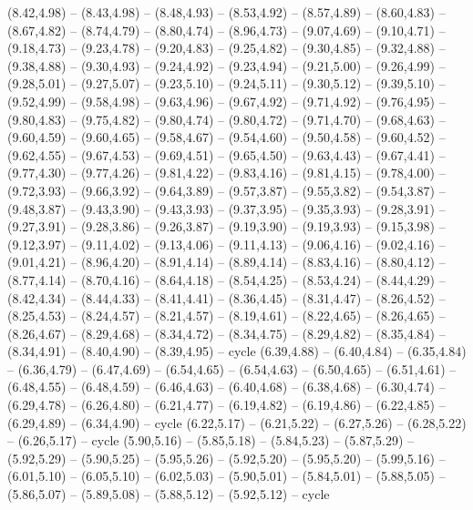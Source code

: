 \expandafter\def\csname geo:gebiet:CHN\endcsname{
  (8.42,4.98) -- (8.43,4.98) -- (8.48,4.93) -- (8.53,4.92) -- (8.57,4.89) -- (8.60,4.83) -- (8.67,4.82) -- (8.74,4.79) -- (8.80,4.74) -- (8.96,4.73) -- (9.07,4.69) -- (9.10,4.71) -- (9.18,4.73) -- (9.23,4.78) -- (9.20,4.83) -- (9.25,4.82) -- (9.30,4.85) -- (9.32,4.88) -- (9.38,4.88) -- (9.30,4.93) -- (9.24,4.92) -- (9.23,4.94) -- (9.21,5.00) -- (9.26,4.99) -- (9.28,5.01) -- (9.27,5.07) -- (9.23,5.10) -- (9.24,5.11) -- (9.30,5.12) -- (9.39,5.10) -- (9.52,4.99) -- (9.58,4.98) -- (9.63,4.96) -- (9.67,4.92) -- (9.71,4.92) -- (9.76,4.95) -- (9.80,4.83) -- (9.75,4.82) -- (9.80,4.74) -- (9.80,4.72) -- (9.71,4.70) -- (9.68,4.63) -- (9.60,4.59) -- (9.60,4.65) -- (9.58,4.67) -- (9.54,4.60) -- (9.50,4.58) -- (9.60,4.52) -- (9.62,4.55) -- (9.67,4.53) -- (9.69,4.51) -- (9.65,4.50) -- (9.63,4.43) -- (9.67,4.41) -- (9.77,4.30) -- (9.77,4.26) -- (9.81,4.22) -- (9.83,4.16) -- (9.81,4.15) -- (9.78,4.00) -- (9.72,3.93) -- (9.66,3.92) -- (9.64,3.89) -- (9.57,3.87) -- (9.55,3.82) -- (9.54,3.87) -- (9.48,3.87) -- (9.43,3.90) -- (9.43,3.93) -- (9.37,3.95) -- (9.35,3.93) -- (9.28,3.91) -- (9.27,3.91) -- (9.28,3.86) -- (9.26,3.87) -- (9.19,3.90) -- (9.19,3.93) -- (9.15,3.98) -- (9.12,3.97) -- (9.11,4.02) -- (9.13,4.06) -- (9.11,4.13) -- (9.06,4.16) -- (9.02,4.16) -- (9.01,4.21) -- (8.96,4.20) -- (8.91,4.14) -- (8.89,4.14) -- (8.83,4.16) -- (8.80,4.12) -- (8.77,4.14) -- (8.70,4.16) -- (8.64,4.18) -- (8.54,4.25) -- (8.53,4.24) -- (8.44,4.29) -- (8.42,4.34) -- (8.44,4.33) -- (8.41,4.41) -- (8.36,4.45) -- (8.31,4.47) -- (8.26,4.52) -- (8.25,4.53) -- (8.24,4.57) -- (8.21,4.57) -- (8.19,4.61) -- (8.22,4.65) -- (8.26,4.65) -- (8.26,4.67) -- (8.29,4.68) -- (8.34,4.72) -- (8.34,4.75) -- (8.29,4.82) -- (8.35,4.84) -- (8.34,4.91) -- (8.40,4.90) -- (8.39,4.95) -- cycle}
\expandafter\def\csname geo:gebiet:TWN\endcsname{
  }
\expandafter\def\csname geo:gebiet:ITA\endcsname{
  (6.39,4.88) -- (6.40,4.84) -- (6.35,4.84) -- (6.36,4.79) -- (6.47,4.69) -- (6.54,4.65) -- (6.54,4.63) -- (6.50,4.65) -- (6.51,4.61) -- (6.48,4.55) -- (6.48,4.59) -- (6.46,4.63) -- (6.40,4.68) -- (6.38,4.68) -- (6.30,4.74) -- (6.29,4.78) -- (6.26,4.80) -- (6.21,4.77) -- (6.19,4.82) -- (6.19,4.86) -- (6.22,4.85) -- (6.29,4.89) -- (6.34,4.90) -- cycle}
\expandafter\def\csname geo:gebiet:DNK\endcsname{
  (6.22,5.17) -- (6.21,5.22) -- (6.27,5.26) -- (6.28,5.22) -- (6.26,5.17) -- cycle}
\expandafter\def\csname geo:gebiet:GBR\endcsname{
  (5.90,5.16) -- (5.85,5.18) -- (5.84,5.23) -- (5.87,5.29) -- (5.92,5.29) -- (5.90,5.25) -- (5.95,5.26) -- (5.92,5.20) -- (5.95,5.20) -- (5.99,5.16) -- (6.01,5.10) -- (6.05,5.10) -- (6.02,5.03) -- (5.90,5.01) -- (5.84,5.01) -- (5.88,5.05) -- (5.86,5.07) -- (5.89,5.08) -- (5.88,5.12) -- (5.92,5.12) -- cycle}
